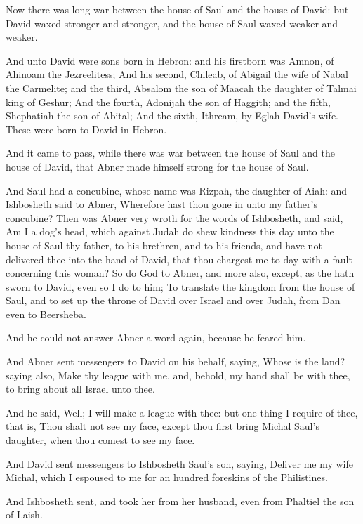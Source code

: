 \Chapter
\Verse Now there was long war between the house of Saul and the house of David: but David waxed stronger and stronger, and the house of Saul waxed weaker and weaker.

\Verse And unto David were sons born in Hebron: and his firstborn was Amnon, of Ahinoam the Jezreelitess; \Verse And his second, Chileab, of Abigail the wife of Nabal the Carmelite; and the third, Absalom the son of Maacah the daughter of Talmai king of Geshur; \Verse And the fourth, Adonijah the son of Haggith; and the fifth, Shephatiah the son of Abital; \Verse And the sixth, Ithream, by Eglah David's wife. These were born to David in Hebron.

\Verse And it came to pass, while there was war between the house of Saul and the house of David, that Abner made himself strong for the house of Saul.

\Verse And Saul had a concubine, whose name was Rizpah, the daughter of Aiah: and Ishbosheth said to Abner, Wherefore hast thou gone in unto my father's concubine?  \Verse Then was Abner very wroth for the words of Ishbosheth, and said, Am I a dog's head, which against Judah do shew kindness this day unto the house of Saul thy father, to his brethren, and to his friends, and have not delivered thee into the hand of David, that thou chargest me to day with a fault concerning this woman?  \Verse So do God to Abner, and more also, except, as the \LORD hath sworn to David, even so I do to him; \Verse To translate the kingdom from the house of Saul, and to set up the throne of David over Israel and over Judah, from Dan even to Beersheba.

\Verse And he could not answer Abner a word again, because he feared him.

\Verse And Abner sent messengers to David on his behalf, saying, Whose is the land? saying also, Make thy league with me, and, behold, my hand shall be with thee, to bring about all Israel unto thee.

\Verse And he said, Well; I will make a league with thee: but one thing I require of thee, that is, Thou shalt not see my face, except thou first bring Michal Saul's daughter, when thou comest to see my face.

\Verse And David sent messengers to Ishbosheth Saul's son, saying, Deliver me my wife Michal, which I espoused to me for an hundred foreskins of the Philistines.

\Verse And Ishbosheth sent, and took her from her husband, even from Phaltiel the son of Laish.

